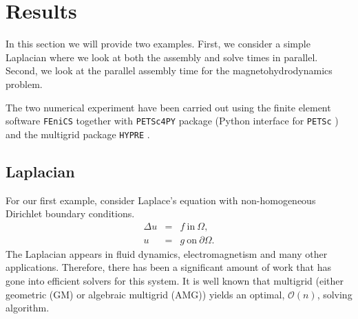 \documentclass[10pt]{article}
\newcommand{\fenics}{{\tt FEniCS} }
\begin{document}

\cite{scotch}

\section{Results}

In this section we will provide two examples. First, we consider a simple Laplacian where we look at both the assembly and solve times in parallel. Second, we look at the parallel assembly time for the magnetohydrodynamics problem.

The two numerical experiment have been carried out using the finite element software \fenics \cite{wells2012automated} together with {\tt PETSc4PY} package (Python interface for {\tt PETSc} \cite{petsc-user-ref,petsc-web-page}) and the multigrid package {\tt HYPRE} \cite{falgout2002hypre}.%

\subsection{Laplacian}

For our first example, consider Laplace's equation with non-homogeneous Dirichlet boundary conditions.
\begin{equation} \label{eq:Lapl}
    \begin{array}{rcl}
        \Delta u &=& f \ \mbox{in} \ \Omega,\\
        u &=& g \ \mbox{on} \ \partial\Omega.
    \end{array}
\end{equation}
The Laplacian appears in fluid dynamics, electromagnetism and many other applications. Therefore, there has been a significant amount of work that has gone into efficient solvers for this system. It is well known that multigrid (either geometric (GM) or algebraic multigrid (AMG)) yields an optimal, $\mathcal{O}(n)$, solving algorithm.
\end{document}
